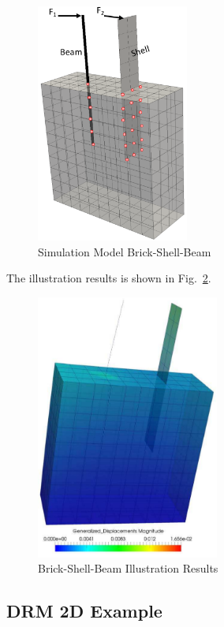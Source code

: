 \begin{figure}[H]
  \centering
  \includegraphics[width = 5cm]{./Figure-files/Day1/Preprocess_examples_with_Gmsh/example2/overview.png}
  \caption{Simulation Model Brick-Shell-Beam}
  \label{fig_gmsh_ex2}
\end{figure}


The illustration results is shown in Fig.~\ref{fig_day1_gmsh_ex_beam_shell_brick}.

\begin{figure}[H]
  \centering
  \includegraphics[width = 6cm]{./Figure-files/Day1/Preprocess_examples_with_Gmsh/example2/beam-shell-results-visual.png}
  \caption{Brick-Shell-Beam Illustration Results }
  \label{fig_day1_gmsh_ex_beam_shell_brick}
\end{figure}


\clearpage
\newpage
\subsection{DRM 2D Example}

